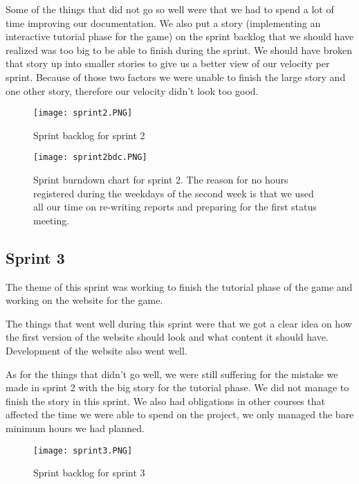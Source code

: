 Some of the things that did not go so well were that we had to spend a lot of time improving our documentation. We also put a story (implementing an interactive tutorial phase for the game) on the sprint backlog that we should have realized was too big to be able to finish during the sprint. We should have broken that story up into smaller stories to give us a better view of our velocity per sprint. Because of those two factors we were unable to finish the large story and one other story, therefore our velocity didn't look too good.

\begin{figure}[H]
	\centering
	\graphicspath{ {./graphics/} }
    \centerline{\texttt{[image: sprint2.PNG]}}
    \caption{\label{fig:s2}Sprint backlog for sprint 2}
\end{figure}

\begin{figure}[H]
	\centering
	\graphicspath{ {./graphics/} }
    \centerline{\texttt{[image: sprint2bdc.PNG]}}
    \caption{\label{fig:s2bd}Sprint burndown chart for sprint 2. The reason for no hours registered during the weekdays of the second week is that we used all our time on re-writing reports and preparing for the first status meeting.}
\end{figure}

\subsection{Sprint 3}
The theme of this sprint was working to finish the tutorial phase of the game and working on the website for the game. 

The things that went well during this sprint were that we got a clear idea on how the first version of the website should look and what content it should have. Development of the website also went well.  

As for the things that didn't go well, we were still suffering for the mistake we made in sprint 2 with the big story for the tutorial phase. We did not manage to finish the story in this sprint. We also had obligations in other courses that affected the time we were able to spend on the project, we only managed the bare minimum hours we had planned. 

\begin{figure}[H]
	\centering
	\graphicspath{ {./graphics/} }
    \centerline{\texttt{[image: sprint3.PNG]}}
    \caption{\label{fig:s3}Sprint backlog for sprint 3}
\end{figure}

